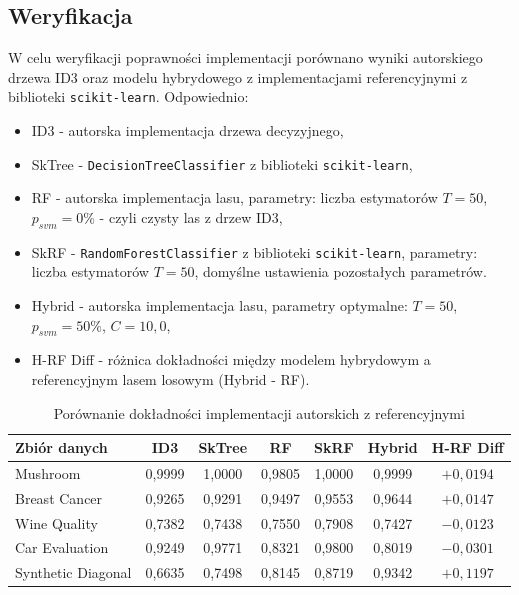 \documentclass[a4paper,11pt]{article}
\begin{document}
\subsection{Weryfikacja}
W celu weryfikacji poprawności implementacji porównano wyniki autorskiego drzewa ID3 oraz modelu hybrydowego z implementacjami referencyjnymi z biblioteki \texttt{scikit-learn}. Odpowiednio:
\begin{itemize}
    \item ID3 - autorska implementacja drzewa decyzyjnego,
    \item SkTree - \texttt{DecisionTreeClassifier} z biblioteki \texttt{scikit-learn},
    \item RF - autorska implementacja lasu, parametry: liczba estymatorów $T=50$, $p_{svm}=0\%$ - czyli czysty las z drzew ID3,
    \item SkRF - \texttt{RandomForestClassifier} z biblioteki \texttt{scikit-learn}, parametry: liczba estymatorów $T=50$, domyślne ustawienia pozostałych parametrów.
    \item Hybrid - autorska implementacja lasu, parametry optymalne: $T=50$, $p_{svm}=50\%$, $C=10{,}0$,
    \item H-RF Diff - różnica dokładności między modelem hybrydowym a referencyjnym lasem losowym (Hybrid - RF).
\end{itemize}

\begin{table}[H]
    \centering
    \caption{Porównanie dokładności implementacji autorskich z referencyjnymi}
    \label{tab:verification}
    \begin{tabular}{lcccccc}
        \toprule
        \textbf{Zbiór danych} & \textbf{ID3} & \textbf{SkTree} & \textbf{RF} & \textbf{SkRF} & \textbf{Hybrid} & \textbf{H-RF Diff} \\
        \midrule
        Mushroom & 0,9999 & 1,0000 & 0,9805 & 1,0000 & 0,9999 & $+0,0194$ \\
        Breast Cancer & 0,9265 & 0,9291 & 0,9497 & 0,9553 & 0,9644 & $+0,0147$ \\
        Wine Quality & 0,7382 & 0,7438 & 0,7550 & 0,7908 & 0,7427 & $-0,0123$ \\
        Car Evaluation & 0,9249 & 0,9771 & 0,8321 & 0,9800 & 0,8019 & $-0,0301$ \\
        Synthetic Diagonal & 0,6635 & 0,7498 & 0,8145 & 0,8719 & 0,9342 & $+0,1197$ \\
        \bottomrule
    \end{tabular}
\end{table}
\end{document}
